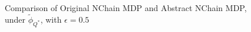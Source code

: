 \documentclass{article}
\newcommand{\ep}{\widetilde \phi}
\newcommand{\epQ}{\ep_{Q^*}}
\begin{document}
\begin{figure}[h]
\label{fig:nchain-visual}
\caption{Comparison of Original NChain MDP and Abstract NChain MDP, under $\epQ$, with $\epsilon=0.5$}
\end{figure} 


%
%
\end{document}
